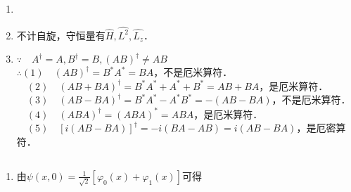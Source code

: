 
\begin{issues}
\issueDraft
\issueTODO
\end{issues}


\subsection{ }
\begin{enumerate}
\item 
\item 不计自旋，守恒量有$\hat H,\hat {L^2},\hat {L_z} $．
\item $\because \quad A^{\dagger} = A,B^{\dagger} = B,(AB)^{\dagger} \neq AB $ \\
$\therefore (1)\quad (AB)^{\dagger} = B^*A^* = BA $，不是厄米算符． \\
$\quad (2)\quad (AB+BA)^{\dagger} = B^*A^*+A^*+B^* = AB+BA $，是厄米算符． \\
$\quad (3)\quad (AB-BA)^{\dagger} = B^*A^*-A^*B^* = -(AB-BA) $，不是厄米算符． \\
$\quad (4)\quad (ABA)^{\dagger} = (ABA)^* = ABA $，是厄米算符． \\
$\quad (5)\quad [i(AB-BA)]^{\dagger} = -i(BA-AB) = i(AB-BA) $，是厄密算符．
\end{enumerate}
\subsection{ }
\begin{enumerate}
\item 由$\psi (x,0) = \frac{1}{\sqrt{2}}[\varphi_{0}(x)+\varphi_{1}(x)] $可得
\end{enumerate}


